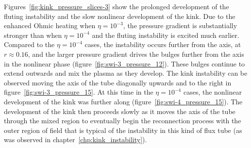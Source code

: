 Figures~\ref{fig:kink_pressure_slices-3} show the prolonged development of the fluting instability and the slow nonlinear development of the kink. Due to the enhanced Ohmic heating when $\eta=10^{-3}$, the pressure gradient is substantially stronger than when $\eta=10^{-4}$ and the fluting instability is excited much earlier. Compared to the $\eta=10^{-4}$ cases, the instability occurs further from the axis, at $r\approx0.16$, and the larger pressure gradient drives the bulges further from the axis in the nonlinear phase (figure~\ref{fig:swi-3_pressure_12}). These bulges continue to extend outwards and mix the plasma as they develop. The kink instability can be observed moving the axis of the tube diagonally upwards and to the right in figure~\ref{fig:swi-3_pressure_15}. At this time in the $\eta=10^{-4}$ cases, the nonlinear development of the kink was further along (figure~\ref{fig:swi-4_pressure_15}). The development of the kink then proceeds slowly as it moves the axis of the tube through the mixed region to eventually begin the reconnection process with the outer region of field that is typical of the instability in this kind of flux tube (as was observed in chapter~\ref{chp:kink_instability}).

